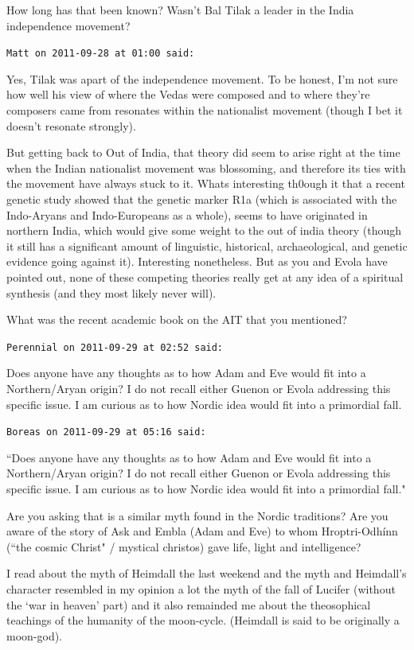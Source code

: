 \begin{footnotesize}
\begin{sffamily}
How long has that been known? Wasn't Bal Tilak a leader in the India independence movement?


\hfill

\texttt{Matt on 2011-09-28 at 01:00 said: }

Yes, Tilak was apart of the independence movement. To be honest, I'm not sure how well his view of where the Vedas were composed and to where they're composers came from resonates within the nationalist movement (though I bet it doesn't resonate strongly).

But getting back to Out of India, that theory did seem to arise right at the time when the Indian nationalist movement was blossoming, and therefore its ties with the movement have always stuck to it. Whats interesting th0ough it that a recent genetic study showed that the genetic marker R1a (which is associated with the Indo-Aryans and Indo-Europeans as a whole), seems to have originated in northern India, which would give some weight to the out of india theory (though it still has a significant amount of linguistic, historical, archaeological, and genetic evidence going against it). Interesting nonetheless. But as you and Evola have pointed out, none of these competing theories really get at any idea of a spiritual synthesis (and they most likely never will).

What was the recent academic book on the AIT that you mentioned?


\hfill

\texttt{Perennial on 2011-09-29 at 02:52 said: }

Does anyone have any thoughts as to how Adam and Eve would fit into a Northern/Aryan origin? I do not recall either Guenon or Evola addressing this specific issue. I am curious as to how Nordic idea would fit into a primordial fall.


\hfill

\texttt{Boreas on 2011-09-29 at 05:16 said: }

``Does anyone have any thoughts as to how Adam and Eve would fit into a Northern/Aryan origin? I do not recall either Guenon or Evola addressing this specific issue. I am curious as to how Nordic idea would fit into a primordial fall."

Are you asking that is a similar myth found in the Nordic traditions? Are you aware of the story of Ask and Embla (Adam and Eve) to whom Hroptri-Odhínn (``the cosmic Christ" / mystical christos) gave life, light and intelligence?

I read about the myth of Heimdall the last weekend and the myth and Heimdall's character resembled in my opinion a lot the myth of the fall of Lucifer (without the `war in heaven' part) and it also remainded me about the theosophical teachings of the humanity of the moon-cycle. (Heimdall is said to be originally a moon-god).



\end{sffamily}
\end{footnotesize}
